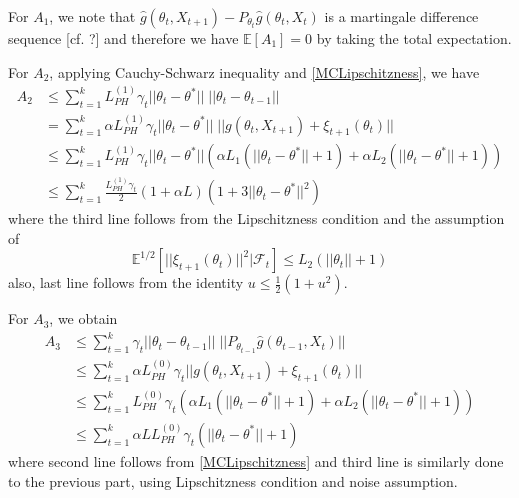 \documentclass[a4paper]{article}
\begin{document}
For $A_{1}$, we note that $\hat{g}\left(\theta_{t}, X_{t + 1}\right) - P_{\theta_{t}}\hat{g}\left(\theta_{t}, X_{t}\right)$ is a martingale difference sequence [cf. ?] and therefore we have $\mathbb{E}[A_{1}] = 0$ by taking the total expectation.

For $A_{2}$, applying Cauchy-Schwarz inequality and \ref{MCLipschitzness}, we have
\begin{equation}
	\begin{split}
		A_{2} & \le \sum_{t = 1}^{k}L_{PH}^{(1)}\gamma_{t}||\theta_{t} - \theta^{*}||\;||\theta_{t} - \theta_{t - 1}||\\
		& = \sum_{t = 1}^{k}\alpha L_{PH}^{(1)}\gamma_{t}||\theta_{t} - \theta^{*}||\;||g(\theta_{t}, X_{t + 1}) + \xi_{t +‌1}(\theta_{t})||\\
		& \le \sum_{t = 1}^{k}L_{PH}^{(1)} \gamma_{t}||\theta_{t} - \theta^{*}||\left(\alpha L_{1}\left(||\theta_{t} - \theta^{*}|| + 1\right) + \alpha L_{2}\left(||\theta_{t} - \theta^{*}|| + 1\right)\right)\\
		& \le \sum_{t = 1}^{k}\frac{L_{PH}^{(1)}\gamma_{t}}{2}(1 + \alpha L)\left(1 + 3||\theta_{t} - \theta^{*}||^{2} \right)
	\end{split}
\end{equation}
where the third line follows from the Lipschitzness condition and the assumption of
$$\mathbb{E}^{1 / 2}\left[||\xi_{t + 1}\left(\theta_{t}\right)||^{2} | \mathcal{F}_{t}\right] \le L_{2}\left(||\theta_{t}|| + 1\right)$$
also, last line follows from the identity $u \le \frac{1}{2}(1 + u^{2})$.

For $A_{3}$, we obtain
\begin{equation}
	\begin{split}
		A_{3} & \le \sum_{t = 1}^{k}\gamma_{t}||\theta_{t} - \theta_{t - 1}|| \; ||P_{\theta_{t - 1}}\hat{g}\left(\theta_{t - 1}, X_{t}\right)||\\
		& \le \sum_{t = 1}^{k}\alpha L_{PH}^{(0)}\gamma_{t}||g\left(\theta_{t}, X_{t + 1}\right)‌ + \xi_{t + 1}(\theta_{t})||\\
		& \le \sum_{t = 1}^{k}L_{PH}^{(0)}\gamma_{t}\left(\alpha L_{1}\left(||\theta_{t} - \theta^{*}|| + 1\right) + \alpha L_{2}\left(||\theta_{t} - \theta^{*}|| + 1\right)\right)\\
		& \le \sum_{t = 1}^{k}\alpha L L_{PH}^{(0)}\gamma_{t}\left(||\theta_{t} - \theta^{*}|| + 1\right)
	\end{split}
\end{equation}
where second line follows from \ref{MCLipschitzness} and third line is similarly done to the previous part, using Lipschitzness condition and noise assumption.
\end{document}
